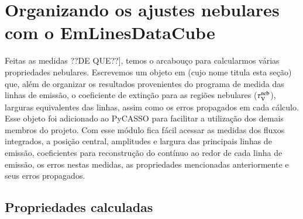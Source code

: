 

\chapter{Organizando os ajustes nebulares com o EmLinesDataCube}
\label{apendice:EmLinesDataCube}

Feitas as medidas {\ATR \ojo ??DE QUE??]}, temos o arcabouço para calcularmos várias propriedades nebulares. Escrevemos um objeto em \pyt (cujo nome titula esta seção) que, além de organizar os resultados provenientes do programa de medida das linhas de emissão, o coeficiente de extinção para as regiões nebulares ($\tau_{\mathrm{V}}^{\mathrm{neb}}$), larguras equivalentes das linhas, assim como os erros propagados em cada cálculo. Esse objeto foi adicionado ao PyCASSO para facilitar a utilização dos demais membros do projeto. Com esse módulo fica fácil acessar as medidas dos fluxos integrados, a posição central, amplitudes e largura das principais linhas de emissão, coeficientes para reconstrução do contínuo ao redor de cada linha de emissão, os erros nestas medidas, as propriedades mencionadas anteriormente e seus erros propagados.


\section{Propriedades calculadas}
\label{apendice:EmLinesDataCube:props}

